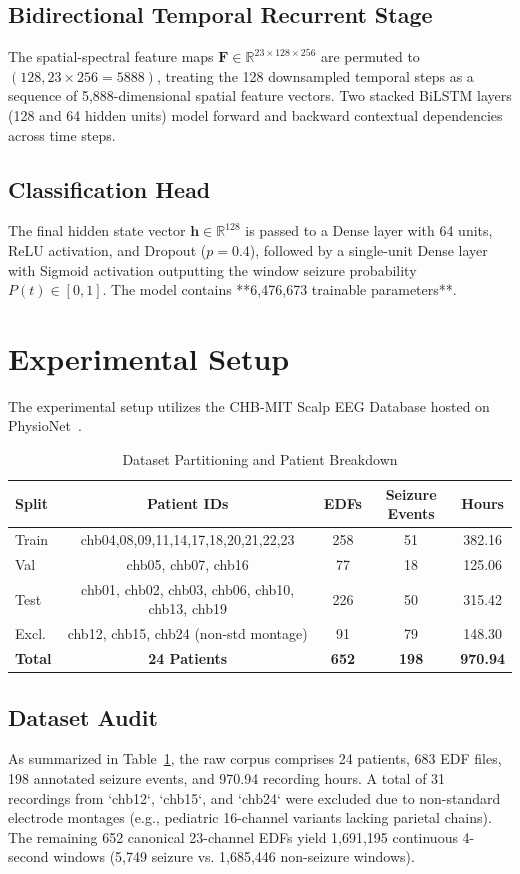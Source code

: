 \documentclass[conference]{IEEEtran}
\begin{document}
\subsection{Bidirectional Temporal Recurrent Stage}
The spatial-spectral feature maps $\mathbf{F} \in \mathbb{R}^{23 \times 128 \times 256}$ are permuted to $(128, 23 \times 256 = 5888)$, treating the 128 downsampled temporal steps as a sequence of 5,888-dimensional spatial feature vectors. Two stacked BiLSTM layers (128 and 64 hidden units) model forward and backward contextual dependencies across time steps.

\subsection{Classification Head}
The final hidden state vector $\mathbf{h} \in \mathbb{R}^{128}$ is passed to a Dense layer with 64 units, ReLU activation, and Dropout ($p=0.4$), followed by a single-unit Dense layer with Sigmoid activation outputting the window seizure probability $P(t) \in [0, 1]$. The model contains **6,476,673 trainable parameters**.

\section{Experimental Setup}
The experimental setup utilizes the CHB-MIT Scalp EEG Database hosted on PhysioNet~\cite{goldberger2000physiobank}.

\begin{table}[t]
\caption{Dataset Partitioning and Patient Breakdown}
\label{tab:dataset}
\centering
\begin{tabular}{lcccc}
\toprule
\textbf{Split} & \textbf{Patient IDs} & \textbf{EDFs} & \textbf{Seizure Events} & \textbf{Hours} \\
\midrule
Train & chb04,08,09,11,14,17,18,20,21,22,23 & 258 & 51 & 382.16 \\
Val & chb05, chb07, chb16 & 77 & 18 & 125.06 \\
Test & chb01, chb02, chb03, chb06, chb10, chb13, chb19 & 226 & 50 & 315.42 \\
Excl. & chb12, chb15, chb24 (non-std montage) & 91 & 79 & 148.30 \\
\midrule
\textbf{Total} & \textbf{24 Patients} & \textbf{652} & \textbf{198} & \textbf{970.94} \\
\bottomrule
\end{tabular}
\end{table}

\subsection{Dataset Audit}
As summarized in Table~\ref{tab:dataset}, the raw corpus comprises 24 patients, 683 EDF files, 198 annotated seizure events, and 970.94 recording hours. A total of 31 recordings from `chb12`, `chb15`, and `chb24` were excluded due to non-standard electrode montages (e.g., pediatric 16-channel variants lacking parietal chains). The remaining 652 canonical 23-channel EDFs yield 1,691,195 continuous 4-second windows (5,749 seizure vs. 1,685,446 non-seizure windows).
\end{document}
